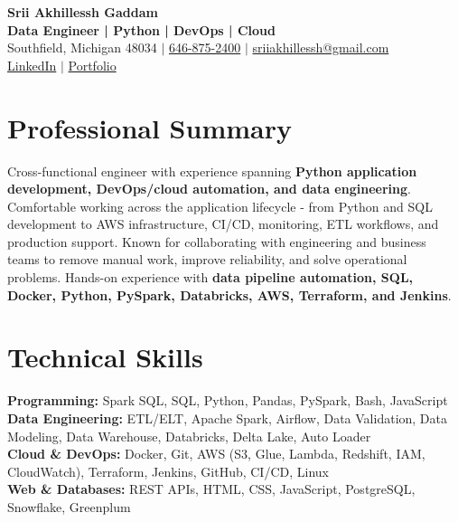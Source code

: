 \documentclass[letterpaper,10pt]{article}
\begin{document}
\fontsize{9.35pt}{10.45pt}\selectfont

\begin{center}
    {\LARGE \textbf{Srii Akhillessh Gaddam}} \\[-1pt]
    \textbf{Data Engineer | Python | DevOps | Cloud} \\[2pt]
    Southfield, Michigan 48034 $|$
    \href{tel:6468752400}{646-875-2400} $|$
    \href{mailto:sriiakhillessh@gmail.com}{sriiakhillessh@gmail.com} \\[1pt]
    \href{https://www.linkedin.com/in/srii-akhiilessh-gaddam-b48668191/}{LinkedIn} $|$
    \href{https://sriiakhillesshg.github.io/portfolio/}{Portfolio}
\end{center}
\vspace{-8pt}

\section{Professional Summary}
\small{Cross-functional engineer with experience spanning \textbf{Python application development, DevOps/cloud automation, and data engineering}. Comfortable working across the application lifecycle - from Python and SQL development to AWS infrastructure, CI/CD, monitoring, ETL workflows, and production support. Known for collaborating with engineering and business teams to remove manual work, improve reliability, and solve operational problems. Hands-on experience with \textbf{data pipeline automation, SQL, Docker, Python, PySpark, Databricks, AWS, Terraform, and Jenkins}.}

\section{Technical Skills}
\small{
\textbf{Programming:} Spark SQL, SQL, Python, Pandas, PySpark, Bash, JavaScript \\
\textbf{Data Engineering:} ETL/ELT, Apache Spark, Airflow, Data Validation, Data Modeling, Data Warehouse, Databricks, Delta Lake, Auto Loader \\
\textbf{Cloud \& DevOps:} Docker, Git, AWS (S3, Glue, Lambda, Redshift, IAM, CloudWatch), Terraform, Jenkins, GitHub, CI/CD, Linux \\
\textbf{Web \& Databases:} REST APIs, HTML, CSS, JavaScript, PostgreSQL, Snowflake, Greenplum
}
\end{document}
